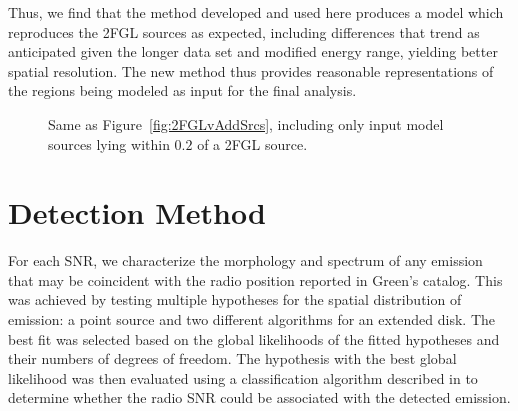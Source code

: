 Thus, we find that the method developed and used here produces a model which reproduces the 2FGL sources as expected, including differences that trend as anticipated given the longer data set and modified energy range, yielding better spatial resolution. The new method thus provides reasonable representations of the regions being modeled as input for the final analysis.

\begin{figure}[h!]
	\centering
	\caption[Same as Figure~\ref{fig:2FGLvAddSrcs}, including only input model sources lying within $0.2$\degr{} of a 2FGL source.]{Same as Figure~\ref{fig:2FGLvAddSrcs}, including only input model sources lying within $0.2$\degr{} of a 2FGL source.}
	\label{fig:2FGLvAddSrcsAssoc} 
\end{figure}


\section{Detection Method}\label{snrcat:DetectMethod}
For each SNR, we characterize the morphology and spectrum of any \gam{} emission that may be coincident with the radio position reported in Green's catalog. This was achieved by testing multiple hypotheses for the spatial distribution of \gam{} emission: a point source and two different algorithms for an extended disk. The best fit was selected based on the global likelihoods of the fitted hypotheses and their numbers of degrees of freedom. The hypothesis with the best global likelihood was then evaluated using a classification algorithm described in \cite{snrCat} to determine whether the radio SNR could be associated with the detected \gam{} emission. 


